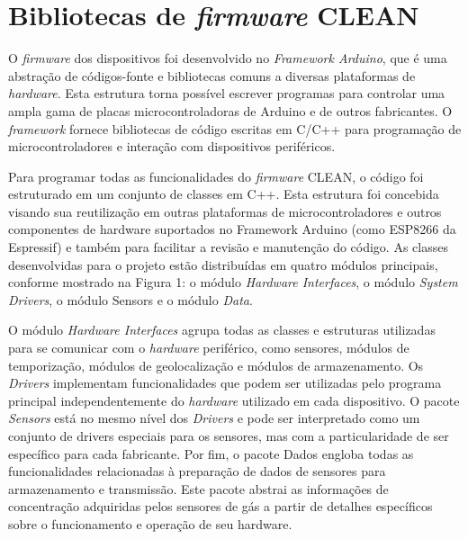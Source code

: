 \chapter{Bibliotecas de \textit{firmware} CLEAN}\label{appendix:firmware-libraries}

O \textit{firmware} dos dispositivos foi desenvolvido no \textit{Framework Arduino}, que é uma abstração de códigos-fonte e bibliotecas comuns a diversas plataformas de \textit{hardware}. Esta estrutura torna possível escrever programas para controlar uma ampla gama de placas microcontroladoras de Arduino e de outros fabricantes. O \textit{framework} fornece bibliotecas de código escritas em C/C++ para programação de microcontroladores e interação com dispositivos periféricos.

Para programar todas as funcionalidades do \textit{firmware} CLEAN, o código foi estruturado em um conjunto de classes em C++. Esta estrutura foi concebida visando sua reutilização em outras plataformas de microcontroladores e outros componentes de hardware suportados no Framework Arduino (como ESP8266 da Espressif) e também para facilitar a revisão e manutenção do código. As classes desenvolvidas para o projeto estão distribuídas em quatro módulos principais, conforme mostrado na Figura 1: o módulo \textit{Hardware Interfaces}, o módulo \textit{System Drivers}, o módulo \textit{}{Sensors} e o módulo \textit{Data}.



O módulo \textit{Hardware Interfaces} agrupa todas as classes e estruturas utilizadas para se comunicar com o \textit{hardware} periférico, como sensores, módulos de temporização, módulos de geolocalização e módulos de armazenamento. Os \textit{Drivers} implementam funcionalidades que podem ser utilizadas pelo programa principal independentemente do \textit{hardware} utilizado em cada dispositivo. O pacote \textit{Sensors} está no mesmo nível dos \textit{Drivers} e pode ser interpretado como um conjunto de drivers especiais para os sensores, mas com a particularidade de ser específico para cada fabricante. Por fim, o pacote Dados engloba todas as funcionalidades relacionadas à preparação de dados de sensores para armazenamento e transmissão. Este pacote abstrai as informações de concentração adquiridas pelos sensores de gás a partir de detalhes específicos sobre o funcionamento e operação de seu hardware.

